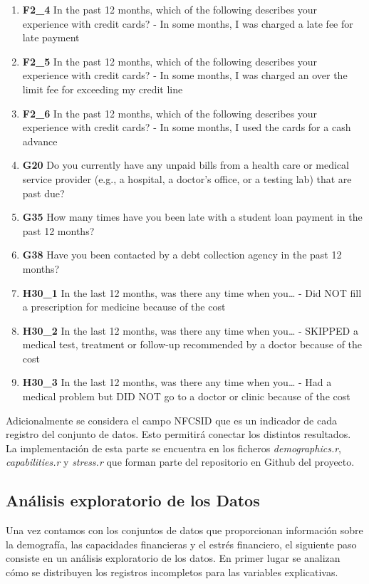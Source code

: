 \documentclass[a4paper, 11pt]{article}
\begin{document}
\begin{enumerate}
    \item \textbf{F2\_4} In the past 12 months, which of the following describes your experience with credit cards? - In some months, I was charged a late fee for late payment 
    \item \textbf{F2\_5} In the past 12 months, which of the following describes your experience with credit cards? - In some months, I was charged an over the limit fee for exceeding my credit line 
    \item \textbf{F2\_6} In the past 12 months, which of the following describes your experience with credit cards? - In some months, I used the cards for a cash advance 
    \item \textbf{G20} Do you currently have any unpaid bills from a health care or medical service provider (e.g., a hospital,
     a doctor's office, or a testing lab) that are past due?
    \item \textbf{G35} How many times have you been late with a student loan payment in the past 12 months?
    \item \textbf{G38} Have you been contacted by a debt collection agency in the past 12 months?
    \item \textbf{H30\_1} In the last 12 months, was there any time when you… - Did NOT fill a prescription for medicine because of the cost
    \item \textbf{H30\_2} In the last 12 months, was there any time when you… - SKIPPED a medical test, treatment or follow-up recommended by a doctor because of the cost
    \item \textbf{H30\_3} In the last 12 months, was there any time when you… - Had a medical problem but DID NOT go to a doctor or clinic because of the cost
\end{enumerate}

Adicionalmente se considera el campo NFCSID que es un indicador de cada registro
del conjunto de datos. Esto permitirá conectar los distintos resultados. La 
implementación de esta parte se encuentra en los ficheros \textit{demographics.r}, \textit{capabilities.r} y \textit{stress.r} que forman
parte del repositorio en Github del proyecto\cite{ALMO25}.

\subsection{Análisis exploratorio de los Datos}
Una vez contamos con los conjuntos de datos que proporcionan información sobre
la demografía, las capacidades financieras y el estrés financiero, el siguiente
paso consiste en un análisis exploratorio de los datos. En primer lugar se
analizan cómo se distribuyen los registros incompletos para las variables explicativas.
\end{document}

